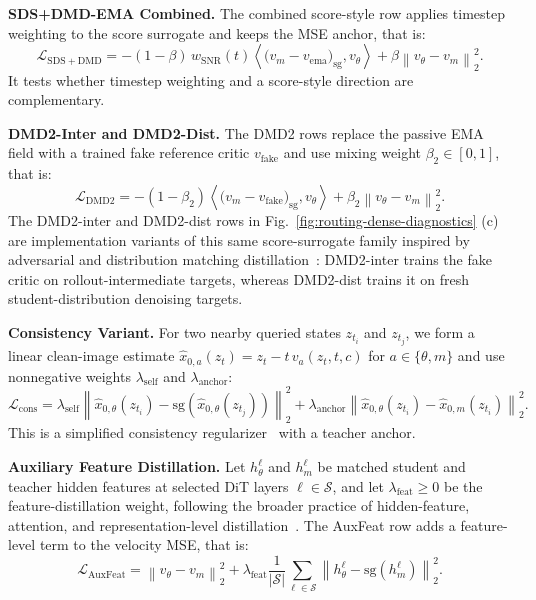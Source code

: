 \documentclass{llmxive}
\begin{document}
\noindent\textbf{SDS+DMD-EMA Combined.}
The combined score-style row applies timestep weighting to the score surrogate and keeps the MSE anchor, that is:
\begin{equation}
  \mathcal{L}_{\mathrm{SDS+DMD}}
  =-(1-\beta)\,w_{\mathrm{SNR}}(t)
  \left\langle \bigl(v_m-v_{\mathrm{ema}}\bigr)_{\mathrm{sg}},v_\theta\right\rangle
  +\beta\left\|v_\theta-v_m\right\|_2^2.
  \label{eq:app-loss-sds-dmd}
\end{equation}
It tests whether timestep weighting and a score-style direction are complementary.

\noindent\textbf{DMD2-Inter and DMD2-Dist.}
The DMD2 rows replace the passive EMA field with a trained fake reference critic $v_{\mathrm{fake}}$ and use mixing weight $\beta_2\in[0,1]$, that is:
\begin{equation}
  \mathcal{L}_{\mathrm{DMD2}}
  =-(1-\beta_2)\left\langle \bigl(v_m-v_{\mathrm{fake}}\bigr)_{\mathrm{sg}},v_\theta\right\rangle
  +\beta_2\left\|v_\theta-v_m\right\|_2^2.
  \label{eq:app-loss-dmd2}
\end{equation}
The DMD2-inter and DMD2-dist rows in Fig.~\ref{fig:routing-dense-diagnostics} (c) are implementation variants of this same score-surrogate family inspired by adversarial and distribution matching distillation~\cite{sauer2024adversarial,sauer2024fast,yin2024one}: DMD2-inter trains the fake critic on rollout-intermediate targets, whereas DMD2-dist trains it on fresh student-distribution denoising targets.

\noindent\textbf{Consistency Variant.}
For two nearby queried states $z_{t_i}$ and $z_{t_j}$, we form a linear clean-image estimate $\hat{x}_{0,a}(z_t)=z_t-t\,v_a(z_t,t,c)$ for $a\in\{\theta,m\}$ and use nonnegative weights $\lambda_{\mathrm{self}}$ and $\lambda_{\mathrm{anchor}}$:
\begin{equation}
  \mathcal{L}_{\mathrm{cons}}
  = \lambda_{\mathrm{self}}
  \left\|\hat{x}_{0,\theta}(z_{t_i})-
      \mathrm{sg}\!\left(\hat{x}_{0,\theta}(z_{t_j})\right)\right\|_2^2
  +\lambda_{\mathrm{anchor}}
  \left\|\hat{x}_{0,\theta}(z_{t_i})-
      \hat{x}_{0,m}(z_{t_i})\right\|_2^2.
  \label{eq:app-loss-consistency}
\end{equation}
This is a simplified consistency regularizer~\cite{song2023consistency,kim2024consistency} with a teacher anchor.

\noindent\textbf{Auxiliary Feature Distillation.}
Let $h_\theta^\ell$ and $h_m^\ell$ be matched student and teacher hidden features at selected DiT layers $\ell\in\mathcal{S}$, and let $\lambda_{\mathrm{feat}}\ge0$ be the feature-distillation weight, following the broader practice of hidden-feature, attention, and representation-level distillation~\cite{romero2014fitnets,zagoruyko2016paying,heo2019comprehensive,ahn2019variational}. The AuxFeat row adds a feature-level term to the velocity MSE, that is:
\begin{equation}
  \mathcal{L}_{\mathrm{AuxFeat}}
  =\left\|v_\theta-v_m\right\|_2^2
  +\lambda_{\mathrm{feat}}\frac{1}{|\mathcal{S}|}
  \sum_{\ell\in\mathcal{S}}\left\|h_\theta^\ell-\mathrm{sg}(h_m^\ell)\right\|_2^2.
  \label{eq:app-loss-auxfeat}
\end{equation}
\end{document}
